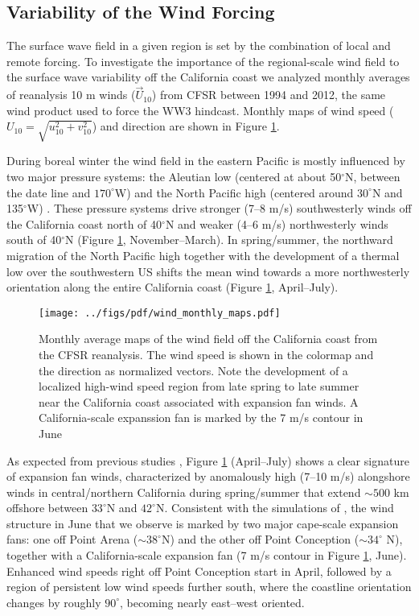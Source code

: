 \subsection{Variability of the Wind Forcing}\label{windvar}
The surface wave field in a given region is set by the combination of local and remote forcing. 
To investigate the importance of the regional-scale wind field to the surface wave variability off the California coast we analyzed monthly averages of reanalysis 10 m winds ($\vec{U}_{10}$) from CFSR between 1994 and 2012, the same wind product used to force the WW3 hindcast. Monthly maps of wind speed ($U_{10} = \sqrt{u_{10}^2 + v_{10}^2}$) and direction are shown in Figure \ref{wind_maps}. 


During boreal winter the wind field in the eastern Pacific is mostly influenced by two major pressure systems: the Aleutian low (centered at about 50$^\circ$N, between the date line and $170^\circ$W) and the North Pacific high (centered around $30^\circ$N and 135$^\circ$W) \citep{schroeder2013north,rodionov2005aleutian}. These pressure systems drive stronger (7--8 m/s) southwesterly winds off the California coast north of 40$^\circ$N and weaker (4--6 m/s) northwesterly winds south of 40$^\circ$N (Figure \ref{wind_maps}, November--March).
In spring/summer, the northward migration of the North Pacific high together with the development of a thermal low over the southwestern US shifts the mean wind towards a more northwesterly orientation along the entire California coast (Figure \ref{wind_maps}, April--July). 
\begin{figure}[h]
\centering
\texttt{[image: ../figs/pdf/wind\_monthly\_maps.pdf]}
\caption{Monthly average maps of the wind field off the California coast from the CFSR reanalysis. The wind speed is shown in the colormap and the direction as normalized vectors. Note the development of a localized high-wind speed region from late spring to late summer near the California coast associated with expansion fan winds. A California-scale expanssion fan is marked by the 7 m/s contour in June}
\label{wind_maps}
\end{figure}
As expected from previous studies \citep{halliwell1987large, taylor2008northerly, schroeder2013north}, Figure \ref{wind_maps} (April--July) shows
a clear signature of expansion fan winds, characterized by anomalously high (7--10 m/s) alongshore winds in central/northern California during spring/summer that extend $\sim 500$ km offshore between $33^\circ$N and $42^\circ$N. 
Consistent with the simulations of \cite{koravcin2004coastal}, the wind structure in June that we observe is marked by two major cape-scale expansion fans: one off Point Arena ($\sim 38^\circ$N) and the other off Point Conception ($\sim 34^\circ$ N), together with a California-scale expansion fan (7 m/s contour in Figure \ref{wind_maps}, June). Enhanced wind speeds right off Point Conception start in April, followed by a region of persistent low wind speeds further south, where the coastline orientation changes by roughly $90^\circ$, becoming nearly east--west oriented. 

